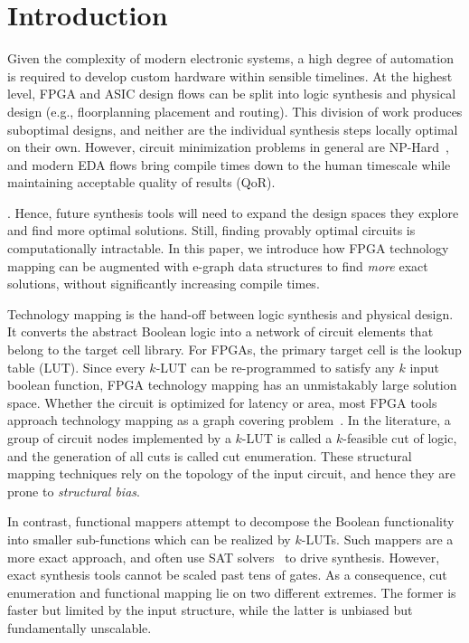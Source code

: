 \section{Introduction}\label{sec:intro}
Given the complexity of modern electronic systems, a high degree of automation
is required to develop custom hardware within sensible timelines. At the
highest level, FPGA and ASIC design flows can be split into logic synthesis and
physical design (e.g., floorplanning placement and routing). This division of
work produces suboptimal designs, and neither are the individual synthesis
steps locally optimal on their own. However, circuit minimization problems in
general are NP-Hard~\cite{logicmin,twolevellogic}, and modern EDA flows bring
compile times down to the human timescale while maintaining acceptable quality
of results (QoR).

.  Hence, future synthesis tools will
need to expand the design spaces they explore and find more optimal solutions.
Still, finding provably optimal circuits is computationally intractable. In
this paper, we introduce how FPGA technology mapping can be augmented with
e-graph data structures to find \textit{more} exact solutions, without
significantly increasing compile times.

Technology mapping is the hand-off between logic synthesis and physical design.
It converts the abstract Boolean logic into a network of circuit elements that
belong to the target cell library. For FPGAs, the primary target cell is the
lookup table (LUT). Since every $k$-LUT can be re-programmed to satisfy any $k$
input boolean function, FPGA technology mapping has an unmistakably large
solution space. Whether the circuit is optimized for latency or area, most FPGA
tools approach technology mapping as a graph covering problem~\cite{flowmap,
    daomap, attmap, imap}. In the literature, a group of circuit nodes implemented
by a $k$-LUT is called a $k$-feasible cut of logic, and the generation of all
cuts is called cut enumeration. These structural mapping techniques rely on the
topology of the input circuit, and hence they are prone to \textit{structural
    bias}.

In contrast, functional mappers attempt to decompose the Boolean functionality
into smaller sub-functions which can be realized by $k$-LUTs. Such mappers are
a more exact approach, and often use SAT solvers~\cite{satmap,satmap2} to drive
synthesis. 
However, exact synthesis tools cannot be scaled past tens of gates. As a
consequence, cut enumeration and functional mapping lie on two different
extremes. The former is faster but limited by the input structure, while the
latter is unbiased but fundamentally unscalable.

